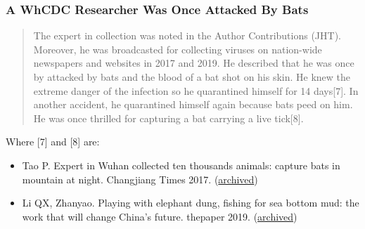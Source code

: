 \documentclass[11pt]{article}
\begin{document}
\subsubsection{A WhCDC Researcher Was Once Attacked By Bats}
\label{sec:org45b6e82}
\begin{quote}
The expert in collection was noted in the Author Contributions (JHT). Moreover, he was broadcasted for collecting viruses on nation-wide newspapers and websites in 2017 and 2019. He described that he was once by attacked by bats and the blood of a bat shot on his skin. He knew the extreme danger of the infection so he quarantined himself for 14 days[7]. In another accident, he quarantined himself again because bats peed on him. He was once thrilled for capturing a bat carrying a live tick[8].
\end{quote}
Where [7] and [8] are:
\begin{itemize}
\item\relax [7] Tao P. Expert in Wuhan collected ten thousands animals: capture bats in mountain at night. Changjiang Times 2017. (\href{https://archive.is/ruSFu}{archived})
\item\relax [8] Li QX, Zhanyao. Playing with elephant dung, fishing for sea bottom mud: the work that will change China’s future. thepaper 2019. (\href{https://archive.is/PiqJt}{archived})
\end{itemize}
\end{document}
